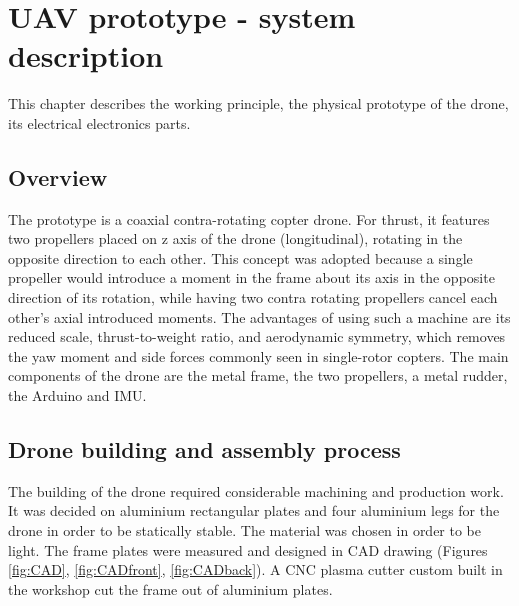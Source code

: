 \chapter{UAV prototype - system description}
This chapter describes the working principle, the physical prototype of the drone, its electrical electronics parts.

\section{Overview}
 
The prototype is a coaxial contra-rotating copter drone. For thrust, it features two propellers placed on z axis of the drone (longitudinal), rotating in the opposite direction to each other. 
This concept was adopted because a single propeller would introduce a moment in the frame about its axis in the opposite direction of its rotation, while having two contra rotating propellers cancel each other’s axial introduced moments. 
 The advantages of using such a machine are its reduced scale, thrust-to-weight ratio,  and  aerodynamic symmetry, which removes the yaw moment and side forces commonly seen in single-rotor copters. \cite{wang2014flight} 
 The main components of the drone are the metal frame, the two propellers, a metal rudder, the Arduino and IMU.
 

 \section{Drone building and assembly process}

The building of the drone required considerable machining and production work. 
It was decided on aluminium rectangular plates and four aluminium legs for the drone in order to be statically stable. The material was chosen in order to be light. 
The frame plates were measured and designed in CAD drawing (Figures \ref{fig:CAD}, \ref{fig:CADfront}, \ref{fig:CADback}). A CNC plasma cutter custom built in the workshop cut the frame out of aluminium plates. 

